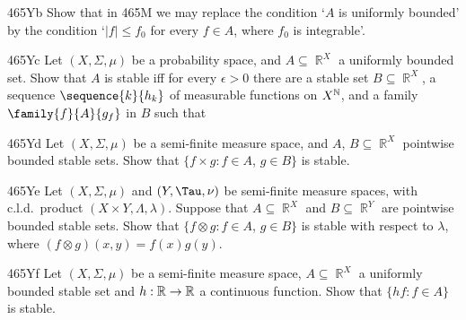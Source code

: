 {\spheader 465Yb Show that in 465M we may replace the condition `$A$ is
uniformly bounded' by the condition `$|f|\le f_0$ for every $f\in A$,
where $f_0$ is integrable'.   





\spheader 465Yc Let $(X,\Sigma,\mu)$ be a probability space, and
$A\subseteq\BbbR^X$ a uniformly bounded set.   Show that $A$ is stable iff
for every $\epsilon>0$ there are a stable set $B\subseteq\BbbR^X$, a
sequence $\sequence{k}{h_k}$ of measurable functions on $X^{\Bbb N}$, and a
family $\family{f}{A}{g_f}$ in $B$ such that



\noindent{}

\spheader 465Yd Let $(X,\Sigma,\mu)$ be a semi-finite measure space,
and $A$, $B\subseteq\BbbR^X$ pointwise bounded stable sets.   Show that
$\{f\times g:f\in A$, $g\in B\}$ is stable.   

\spheader 465Ye Let $(X,\Sigma,\mu)$ and $(Y,\Tau,\nu)$ be semi-finite
measure spaces, with c.l.d.\ product $(X\times Y,\Lambda,\lambda)$.
Suppose that $A\subseteq\BbbR^X$ and $B\subseteq\BbbR^Y$ are pointwise
bounded stable sets.   Show that $\{f\otimes g:f\in A$, $g\in B\}$ is
stable with respect to $\lambda$, where $(f\otimes g)(x,y)=f(x)g(y)$.

\spheader 465Yf Let $(X,\Sigma,\mu)$ be a semi-finite measure space,
$A\subseteq\BbbR^X$ a uniformly bounded stable set and
$h:\Bbb R\to\Bbb R$ a continuous
function.   Show that $\{hf:f\in A\}$ is stable.

}
